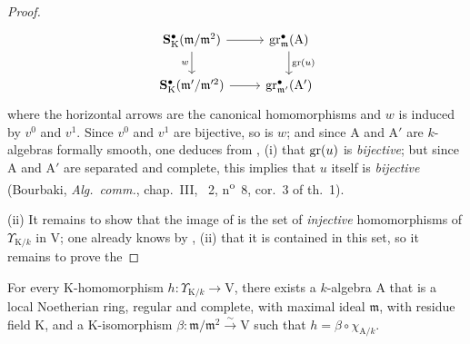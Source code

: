 \begin{proof}
\[
  \begin{tikzcd}
    \mathbf{S}^\bullet_\mathrm{K}(\mathfrak{m}/\mathfrak{m}^2) \ar[r] \ar[d,"w"'] & \gr^\bullet_\mathfrak{m}(\mathrm{A}) \ar[d,"\gr(u)"]\\
    \mathbf{S}^\bullet_\mathrm{K}(\mathfrak{m}'/\mathfrak{m}'^2) \ar[r] & \gr^\bullet_{\mathfrak{m}'}(\mathrm{A}')
  \end{tikzcd}
\]
where the horizontal arrows are the canonical homomorphisms and $w$ is induced by $v^0$ and $v^1$. Since $v^0$ and $v^1$ are bijective, so is $w$; and since $\mathrm{A}$ and $\mathrm{A}'$ are $k$-algebras formally smooth, one deduces from , (i) that $\operatorname{gr}(u)$ is \emph{bijective}; but since $\mathrm{A}$ and $\mathrm{A}'$ are separated and complete, this implies that $u$ itself is \emph{bijective} (Bourbaki, \emph{Alg.~comm.}, chap.~III, \textsection~2, n\textsuperscript{o}~8, cor.~3 of th.~1).

(ii) It remains to show that the image of  is the set of \emph{injective} homomorphisms of $\Upsilon_{\mathrm{K}/k}$ in $\mathrm{V}$; one already knows by , (ii) that it is contained in this set, so it remains to prove the
\end{proof}

\begin{lemma}[22.2.5.2]
\label{0.22.2.5.2}
For every $\mathrm{K}$-homomorphism $h:\Upsilon_{\mathrm{K}/k}\to\mathrm{V}$, there exists a $k$-algebra $\mathrm{A}$ that is a local Noetherian ring, regular and complete, with maximal ideal $\mathfrak{m}$, with residue field $\mathrm{K}$, and a $\mathrm{K}$-isomorphism $\beta:\mathfrak{m}/\mathfrak{m}^2\xrightarrow{\sim}\mathrm{V}$ such that $h=\beta\circ\chi_{\mathrm{A}/k}$.
\end{lemma}

